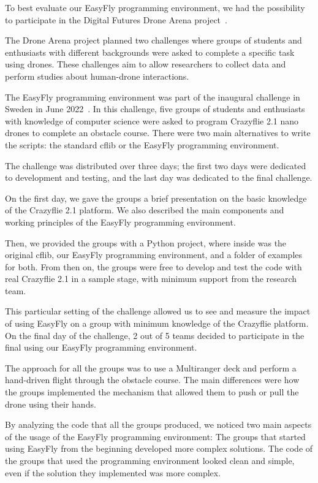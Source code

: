 To best evaluate our EasyFly programming environment, we had the possibility to participate in the Digital Futures Drone Arena project~\cite{dronearena}.

The Drone Arena project planned two challenges where groups of students and enthusiasts with different backgrounds were asked to complete a specific task using drones.
These challenges aim to allow researchers to collect data and perform studies about human-drone interactions.

The EasyFly programming environment was part of the inaugural challenge in Sweden in June 2022~\cite{dronearenaChallenge}. 
In this challenge, five groups of students and enthusiasts with knowledge of computer science were asked to program Crazyflie 2.1 nano drones to complete an obstacle course.
There were two main alternatives to write the scripts: the standard cflib or the EasyFly programming environment. 

The challenge was distributed over three days; the first two days were dedicated to development and testing, and the last day was dedicated to the final challenge.%

On the first day, we gave the groups a brief presentation on the basic knowledge of the Crazyflie 2.1 platform. 
We also described the main components and working principles of the EasyFly programming environment.

Then, we provided the groups with a Python project, where inside was the original cflib, our EasyFly programming environment, and a folder of examples for both.
From then on, the groups were free to develop and test the code with real Crazyflie 2.1 in a sample stage, with minimum support from the research team.

This particular setting of the challenge allowed us to see and measure the impact of using EasyFly on a group with minimum knowledge of the Crazyflie platform. 
On the final day of the challenge, 2 out of 5 teams decided to participate in the final using our EasyFly programming environment. 

The approach for all the groups was to use a Multiranger deck and perform a hand-driven flight through the obstacle course.
The main differences were how the groups implemented the mechanism that allowed them to push or pull the drone using their hands.

By analyzing the code that all the groups produced, we noticed two main aspects of the usage of the EasyFly programming environment:
The groups that started using EasyFly from the beginning developed more complex solutions.
The code of the groups that used the programming environment looked clean and simple, even if the solution they implemented was more complex.

